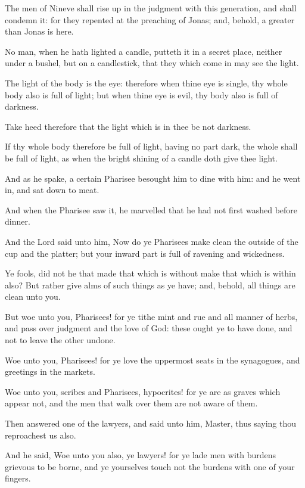\verse The men of Nineve shall rise up in the judgment with this generation, and shall condemn it: for they repented at the preaching of Jonas; and, behold, a greater than Jonas is here.

\verse No man, when he hath lighted a candle, putteth it in a secret place, neither under a bushel, but on a candlestick, that they which come in may see the light.

\verse The light of the body is the eye: therefore when thine eye is single, thy whole body also is full of light; but when thine eye is evil, thy body also is full of darkness.

\verse Take heed therefore that the light which is in thee be not darkness.

\verse If thy whole body therefore be full of light, having no part dark, the whole shall be full of light, as when the bright shining of a candle doth give thee light.

\verse And as he spake, a certain Pharisee besought him to dine with him: and he went in, and sat down to meat.

\verse And when the Pharisee saw it, he marvelled that he had not first washed before dinner.

\verse And the Lord said unto him, Now do ye Pharisees make clean the outside of the cup and the platter; but your inward part is full of ravening and wickedness.

\verse Ye fools, did not he that made that which is without make that which is within also?  \verse But rather give alms of such things as ye have; and, behold, all things are clean unto you.

\verse But woe unto you, Pharisees! for ye tithe mint and rue and all manner of herbs, and pass over judgment and the love of God: these ought ye to have done, and not to leave the other undone.

\verse Woe unto you, Pharisees! for ye love the uppermost seats in the synagogues, and greetings in the markets.

\verse Woe unto you, scribes and Pharisees, hypocrites! for ye are as graves which appear not, and the men that walk over them are not aware of them.

\verse Then answered one of the lawyers, and said unto him, Master, thus saying thou reproachest us also.

\verse And he said, Woe unto you also, ye lawyers! for ye lade men with burdens grievous to be borne, and ye yourselves touch not the burdens with one of your fingers.

